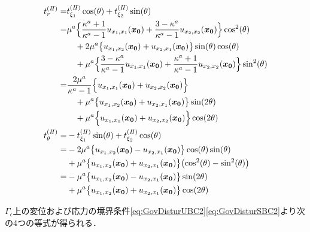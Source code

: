 \begin{align}
	t_{r}^{(I\hspace{-.15em}I)}
		=&t_{\xi_1}^{(I\hspace{-.15em}I)}\cos(\theta)+t_{\xi_2}^{(I\hspace{-.15em}I)}\sin(\theta)
			\nonumber
			\\
		=&\mu^a\Bigl\{\frac{\kappa^a+1}{\kappa^a-1} u_{x_{1},x_{1}}(\bm{x_{0}})
			+\frac{3-\kappa^a}{\kappa^a-1} u_{x_{2},x_{2}}(\bm{x_{0}})\Bigr\}\cos^2(\theta)
			\nonumber
			\\
			&\quad+2\mu^a\bigl\{u_{x_{1},x_{2}}(\bm{x_{0}})
			+u_{x_{2},x_{1}}(\bm{x_{0}})\bigr\}\sin(\theta)\cos(\theta)
			\nonumber
			\\
			&\quad+\mu^a\Bigl\{ \frac{3-\kappa^a}{\kappa^a-1} u_{x_{1},x_{1}}(\bm{x_{0}})
			+\frac{\kappa^a+1}{\kappa^a-1} u_{x_{2},x_{2}}(\bm{x_{0}})\Bigr\}\sin^2(\theta)
			\nonumber
			\\
		=&\frac{2\mu^a}{\kappa^a-1}\Bigl\{ u_{x_{1},x_{1}}(\bm{x_{0}})
			+ u_{x_{2},x_{2}}(\bm{x_{0}})\Bigr\}
			\nonumber
			\\
			&\quad+\mu^a\bigl\{u_{x_{1},x_{2}}(\bm{x_{0}})
			+u_{x_{2},x_{1}}(\bm{x_{0}})\bigr\}\sin(2\theta)
			\nonumber
			\\
			&\quad+\mu^a\Bigl\{ u_{x_{1},x_{1}}(\bm{x_{0}})
			+ u_{x_{2},x_{2}}(\bm{x_{0}})\Bigr\}\cos(2\theta)
			\\
	t_{\theta}^{(I\hspace{-.15em}I)}				
		=&-t_{\xi_1}^{(I\hspace{-.15em}I)}\sin(\theta)+t_{\xi_2}^{(I\hspace{-.15em}I)}\cos(\theta)
			\nonumber
			\\
		=&-2\mu^a \bigl\{u_{x_{1},x_{2}}(\bm{x_{0}})-u_{x_{2},x_{1}}(\bm{x_{0}})\bigr\}\cos(\theta)\sin(\theta)
			\nonumber
			\\
			&+\mu^a \bigl\{u_{x_{1},x_{2}}(\bm{x_{0}})+u_{x_{2},x_{1}}(\bm{x_{0}})\bigr\}
			\bigl(\cos^2(\theta)-\sin^2(\theta)\bigr)
			\nonumber
			\\
		=&-\mu^a \bigl\{u_{x_{1},x_{2}}(\bm{x_{0}})-u_{x_{2},x_{1}}(\bm{x_{0}})\bigr\}\sin(2\theta)
			\nonumber
			\\
			&+\mu^a \bigl\{u_{x_{1},x_{2}}(\bm{x_{0}})+u_{x_{2},x_{1}}(\bm{x_{0}})\bigr\}\cos(2\theta)
\end{align}

$\Gamma_{\epsilon}$上の変位および応力の境界条件\eqref{eq:GovDisturUBC2}\eqref{eq:GovDisturSBC2}より次の4つの等式が得られる．

